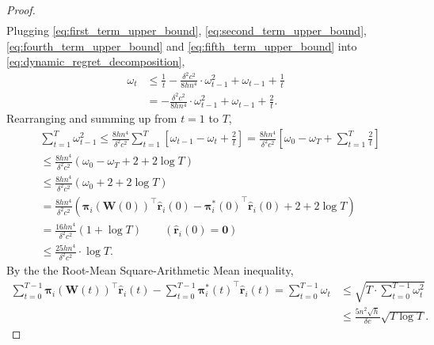 \documentclass[10pt]{article}
\def\rvr{{\mathbf{r}}}
\def\rvzero{{\mathbf{0}}}
\def\rvpi{{\boldsymbol{\pi}}}
\def\rmW{{\mathbf{W}}}
\begin{document}
\begin{proof}
\begin{equation}
\begin{split}
\end{split}
\end{equation}
Plugging \cref{eq:first_term_upper_bound}, \cref{eq:second_term_upper_bound}, \cref{eq:fourth_term_upper_bound} and \cref{eq:fifth_term_upper_bound} into \cref{eq:dynamic_regret_decomposition},
\begin{equation*}
\begin{split}
    \omega_t &\le \frac{1}{t} - \frac{\delta^2 c^2}{8 h n^4} \cdot \omega_{t-1}^2 + \omega_{t-1} + \frac{1}{t} \\
    &= - \frac{\delta^2 c^2}{8 h n^4} \cdot \omega_{t-1}^2 + \omega_{t-1} + \frac{2}{t}.
\end{split}
\end{equation*}
Rearranging and summing up from $t = 1$ to $T$,
\begin{equation*}
\begin{split}
    &\sum\limits_{t=1}^{T}{ \omega_{t-1}^2 } \le \frac{8 h n^4}{\delta^2 c^2} \sum\limits_{t=1}^{T}{\left[ \omega_{t-1} - \omega_t + \frac{2}{t} \right]} = \frac{8 h n^4}{\delta^2 c^2} \left[ \omega_0 - \omega_T + \sum\limits_{t=1}^{T}{\frac{2}{t}} \right] \\
    &\le \frac{8 h n^4}{\delta^2 c^2} \left( \omega_0 - \omega_T + 2 + 2 \log{T} \right) \\
    &\le \frac{8 h n^4}{\delta^2 c^2} \left( \omega_0 + 2 + 2 \log{T} \right) \\
    &= \frac{8 h n^4}{\delta^2 c^2} \left( \rvpi_i\left(\rmW(0)\right)^\top \hat{\rvr}_i(0) - {\rvpi_i^*(0)}^\top \hat{\rvr}_i(0) + 2 + 2 \log{T} \right) \\
    &= \frac{16 h n^4}{\delta^2 c^2} \left( 1 + \log{T} \right) \qquad \left( \hat{\rvr}_i(0) = \rvzero \right) \\
    &\le \frac{25 h n^4}{\delta^2 c^2} \cdot \log{T}.
\end{split}
\end{equation*}
By the the Root-Mean Square-Arithmetic Mean inequality,
\begin{equation}
\label{eq:dynamic_regret_upper_bound}
\begin{split}
    \sum\limits_{t=0}^{T-1}{ \rvpi_i\left(\rmW(t)\right)^\top \hat{\rvr}_i(t)} - \sum\limits_{t=0}^{T-1}{ {\rvpi_i^*(t)}^\top \hat{\rvr}_i(t)} = \sum\limits_{t=0}^{T-1}{ \omega_t } &\le \sqrt{ T \cdot \sum\limits_{t=0}^{T-1}{ \omega_{t}^2 } } \\
    &\le \frac{5 n^2 \sqrt{h}}{\delta c}\sqrt{T \log{T}}.
\end{split}
\end{equation}
\end{proof}
\end{document}
